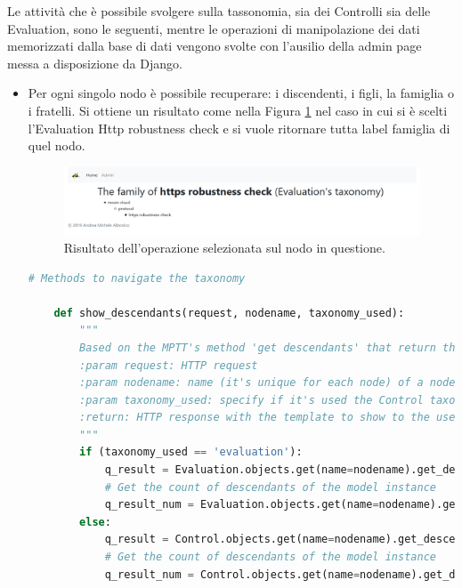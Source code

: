 %
Le attività che è possibile svolgere sulla tassonomia, sia dei Controlli sia delle Evaluation, sono le seguenti, mentre le operazioni 
di manipolazione dei dati memorizzati dalla base di dati vengono svolte con l'ausilio della admin page messa a disposizione da Django.\hfill\break
\begin{itemize}
    \item Per ogni singolo nodo è possibile recuperare: i discendenti, i figli, la famiglia o i fratelli. Si ottiene un risultato come nella
    Figura \ref{fig:MCRS_taxnodedetails} nel caso in cui si è scelti l'Evaluation Http robustness check e si vuole ritornare tutta label
    famiglia di quel nodo.
    \begin{figure}[ht!]
        \includegraphics[scale=0.3]{images/MCRS_taxnodedetails.png}
        \caption{Risultato dell'operazione selezionata sul nodo in questione.}
        \label{fig:MCRS_taxnodedetails}
    \end{figure}
    \lstset{style=python_code_style}
    \begin{lstlisting}[language=Python, label=lst:view_tax_nodedetails, caption={Codice utilizzato all'interno delle View per 
        implementare le operazioni per restituire i discendenti, i figli, la famiglia o i fratelli.}]
    # Methods to navigate the taxonomy
 
    def show_descendants(request, nodename, taxonomy_used):
        """
        Based on the MPTT's method 'get descendants' that return the descendants of a model instance, in tree order
        :param request: HTTP request
        :param nodename: name (it's unique for each node) of a node in the taxonomy
        :param taxonomy_used: specify if it's used the Control taxonomy or the Evaluation taxonomy
        :return: HTTP response with the template to show to the user
        """
        if (taxonomy_used == 'evaluation'):
            q_result = Evaluation.objects.get(name=nodename).get_descendants(include_self=False)
            # Get the count of descendants of the model instance
            q_result_num = Evaluation.objects.get(name=nodename).get_descendant_count()
        else:
            q_result = Control.objects.get(name=nodename).get_descendants(include_self=False)
            # Get the count of descendants of the model instance
            q_result_num = Control.objects.get(name=nodename).get_descendant_count()
 

\end{lstlisting}
\end{itemize}

